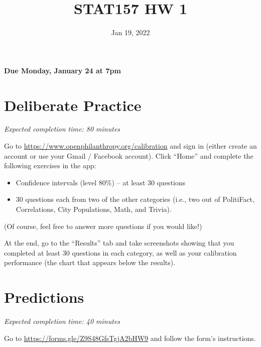 \documentclass[11pt]{article}
\title{STAT157 HW 1}
\date{Jan 19, 2022}
\begin{document}
\maketitle

\hfill \textbf{Due Monday, January 24 at 7pm}

\section*{Deliberate Practice}

\emph{Expected completion time: 80 minutes}

Go to \url{https://www.openphilanthropy.org/calibration} and sign in (either create an account or use your 
Gmail / Facebook account). Click ``Home'' and complete the following exercises in the app:

\begin{itemize}

\item Confidence intervals (level 80\%) -- at least 30 questions
\item 30 questions each from two of the other categories (i.e., two out of PolitiFact, Correlations, City Populations, Math, and Trivia).

\end{itemize}

(Of course, feel free to answer more questions if you would like!)

At the end, go to the ``Results'' tab and take screenshots showing that 
you completed at least 30 questions in each category, as well as your calibration 
performance (the chart that appears below the results).

\section*{Predictions}

\emph{Expected completion time: 40 minutes}

Go to \url{https://forms.gle/Z9S48GfsTgjA2bHW9} and follow the form's instructions.
\end{document}
